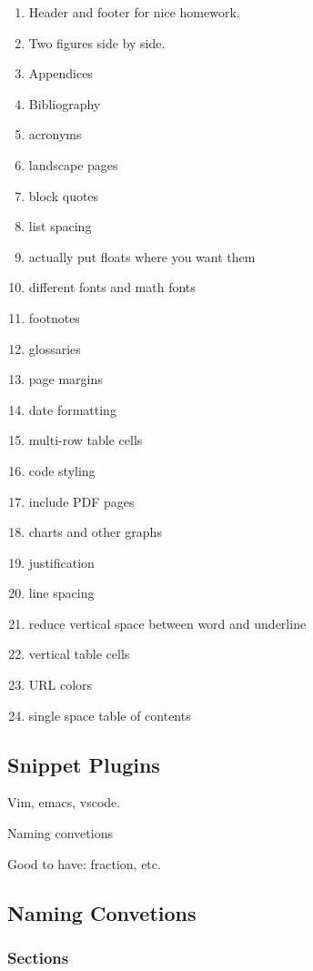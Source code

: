 \documentclass[12pt]{article}
\begin{document}
\begin{enumerate}
  \item Header and footer for nice homework.
  \item Two figures side by side.
  \item Appendices
  \item Bibliography
  \item acronyms
  \item landscape pages
  \item block quotes
  \item list spacing
  \item actually put floats where you want them
  \item different fonts and math fonts
  \item footnotes
  \item glossaries
  \item page margins
  \item date formatting
  \item multi-row table cells
  \item code styling
  \item include PDF pages
  \item charts and other graphs
  \item justification
  \item line spacing
  \item reduce vertical space between word and underline
  \item vertical table cells
  \item URL colors
  \item single space table of contents
\end{enumerate}

\subsection{Snippet Plugins}%
\label{bbs.snippet-plugins}

Vim, emacs, vscode.

Naming convetions

Good to have: fraction, etc.

\subsection{Naming Convetions}%
\label{bbs.name-convs}

\subsubsection{Sections}%
\label{bbs.name-convs.sections}
\end{document}
